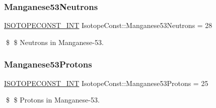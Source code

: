 \subsubsection{\texorpdfstring{Manganese53\+Neutrons}{Manganese53Neutrons}}
{\footnotesize\ttfamily \mbox{\hyperlink{group___isotope_const-_macros_ga5f18360b3e99483a35c32d789e62621c}{I\+S\+O\+T\+O\+P\+E\+C\+O\+N\+S\+T\+\_\+\+I\+NT}} Isotope\+Const\+::\+Manganese53\+Neutrons = 28}

\$ \$ Neutrons in Manganese-\/53. \mbox{\label{group___isotope_const-_manganese-_mn53_ga0e61643cadb8b511577cfd2ed3d0d9f1}} 
\subsubsection{\texorpdfstring{Manganese53\+Protons}{Manganese53Protons}}
{\footnotesize\ttfamily \mbox{\hyperlink{group___isotope_const-_macros_ga5f18360b3e99483a35c32d789e62621c}{I\+S\+O\+T\+O\+P\+E\+C\+O\+N\+S\+T\+\_\+\+I\+NT}} Isotope\+Const\+::\+Manganese53\+Protons = 25}

\$ \$ Protons in Manganese-\/53. 